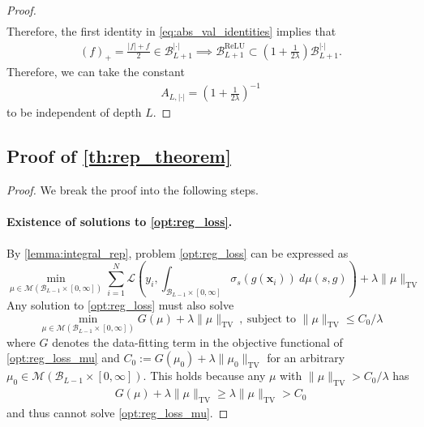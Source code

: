 \documentclass{article}
\DeclareMathOperator{\TV}{TV}
\DeclareMathOperator{\ReLU}{\mathrm{ReLU}}
\def\vx{{\bm{x}}}
\def\cB{{\mathcal{B}}}
\def\cL{{\mathcal{L}}}
\def\cM{{\mathcal{M}}}
\begin{document}
\begin{appendices}
\begin{proof}
\begin{align}
    \end{align}
    Therefore, the first identity in \eqref{eq:abs_val_identities} implies that
    \begin{align}
        (f)_+ = \frac{|f| + f}{2} \in \cB_{L+1}^{|\cdot|} \implies \cB_{L+1}^{\ReLU} \subset \left(1 + \frac{1}{2 \lambda} \right) \cB_{L+1}^{|\cdot|}.
    \end{align}
    Therefore, we can take the constant
    \begin{align}
        A_{L, |\cdot|} = \left( 1 + \frac{1}{2 \lambda} \right)^{-1}
    \end{align}
    to be independent of depth $L$.
\end{proof}


\subsection{Proof of \cref{th:rep_theorem}} \label{appendix:rep_theorem_proof}
\begin{proof}
    We break the proof into the following steps. 
    \paragraph{Existence of solutions to \eqref{opt:reg_loss}.} By \cref{lemma:integral_rep}, problem \eqref{opt:reg_loss} can be expressed as
    \begin{equation} \label{opt:reg_loss_mu}
        \min_{\mu \in \cM(\cB_{L-1} \times [0,\infty])} \sum_{i=1}^N \cL \left(y_i, \int_{\cB_{L-1} \times [0,\infty]} \sigma_s(g(\vx_i)) \ d \mu(s,g) \right) + \lambda \| \mu \|_{\TV}
    \end{equation}
    Any solution to \eqref{opt:reg_loss} must also solve
    \begin{equation} \label{opt:reg_loss_mu_constrained}
     \min_{\mu \in \cM(\cB_{L-1} \times [0,\infty])}  G(\mu) + \lambda \| \mu \|_{\TV} \ , \ \mbox{subject to } \| \mu \|_{\TV} \leq C_0/\lambda
    \end{equation}
    where $G$ denotes the data-fitting term in the objective functional of \eqref{opt:reg_loss_mu} and $C_0 := G(\mu_0) + \lambda \| \mu_0 \|_{\TV}$ for an arbitrary $\mu_0 \in \cM(\cB_{L-1} \times [0,\infty])$. This holds because any $\mu$ with $\| \mu \|_{\TV } > C_0/\lambda$ has
    \begin{align}
        G(\mu) + \lambda \| \mu \|_{\TV} \geq \lambda \| \mu \|_{\TV} > C_0
    \end{align}
    and thus cannot solve \eqref{opt:reg_loss_mu}.


\end{proof}
\end{appendices}
\end{document}
